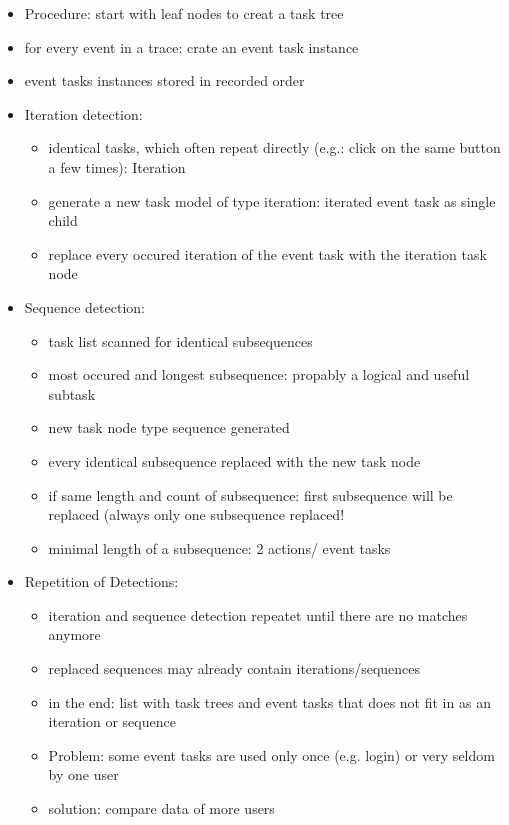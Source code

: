 \begin{itemize}
	
	\item Procedure: start with leaf nodes to creat a task tree
 	\item for every event in a trace: crate an event task instance
  	\item event tasks instances stored in recorded order

	\item Iteration detection:
	\begin{itemize} 
		\item identical tasks, which often repeat directly (e.g.: click on the same button a few times): Iteration
		\item generate a new task model of type iteration: iterated event task as single child
		\item replace every occured iteration of the event task with the iteration task node 
	\end{itemize}

	\item Sequence detection:
	\begin{itemize}
		\item task list scanned for identical subsequences
    		\item most occured and longest subsequence: propably a logical and useful subtask
		\item new task node type sequence generated
		\item every identical subsequence replaced with the new task node 
		\item if same length and count of subsequence: first subsequence will be replaced (always only one subsequence replaced!
    		\item minimal length of a subsequence: 2 actions/ event tasks
	\end{itemize}
	\item Repetition of Detections:
	\begin{itemize}
		\item iteration and sequence detection repeatet until there are no matches anymore
  		\item replaced sequences may already contain iterations/sequences 
		\item in the end: list with task trees and event tasks that does not fit in as an iteration or sequence
		\item Problem: some event tasks are used only once (e.g. login) or very seldom by one user
		\item solution: compare data of more users 
	\end{itemize}
\end{itemize}
